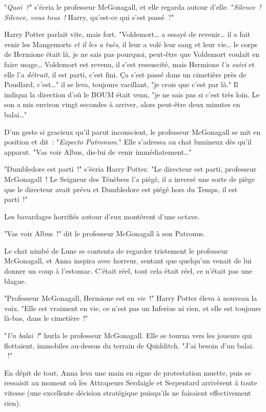 "\emph{Quoi~?}" s'écria le professeur McGonagall, et elle regarda autour d'elle. "\emph{Silence~! Silence, vous tous~!} Harry, qu'est-ce qui s'est passé~?"

Harry Potter parlait vite, mais fort. "Voldemort… a essayé de revenir… il a fait venir les Mangemorts \emph{et il les a tués}, il leur a volé leur sang et leur vie… le corps de Hermione était là, je ne sais pas pourquoi, peut-être que Voldemort voulait en faire usage… Voldemort est revenu, il s'est ressuscité, mais Hermione \emph{l'a suivi} et elle l'a \emph{détruit}, il est parti, c'est fini. Ça s'est passé dans un cimetière près de Poudlard, c'est…" il se leva, toujours vacillant, "je crois que c'est par là." Il indiqua la direction d'où le BOUM était venu, "je ne sais pas si c'est très loin. Le son a mis environ vingt secondes à arriver, alors peut-être deux minutes en balai…"

D'un geste si gracieux qu'il parut inconscient, le professeur McGonagall se mit en position et dit~: "\emph{Expecto Patronum.}" Elle s'adressa au chat lumineux dès qu'il apparut. "Vas voir Albus, dis-lui de venir immédiatement…"

"Dumbledore est parti~!" s'écria Harry Potter. "Le directeur est parti, professeur McGonagall~! Le Seigneur des Ténèbres l'a piégé, il a inversé une sorte de piège que le directeur avait prévu et Dumbledore est piégé hors du Temps, il est parti~!"

Les bavardages horrifiés autour d'eux montèrent d'une octave.

"Vas voir Albus~!" dit le professeur McGonagall à son Patronus.

Le chat nimbé de Lune se contenta de regarder tristement le professeur McGonagall, et Anna inspira avec horreur, sentant que quelqu'un venait de lui donner un coup à l'estomac. C'était réel, tout cela était réel, ce n'était pas une blague.

"Professeur McGonagall, Hermione est en \emph{vie}~!" Harry Potter éleva à nouveau la voix. "Elle est vraiment en vie, ce n'est pas un Inferius ni rien, et elle est toujours là-bas, dans le cimetière~!"

"\emph{Un balai~!}" hurla le professeur McGonagall. Elle se tourna vers les joueurs qui flottaient, immobiles au-dessus du terrain de Quidditch. "J'ai besoin d'un balai. ~!"

En dépit de tout, Anna leva une main en signe de protestation muette, puis se ressaisit au moment où les Attrapeurs Serdaigle et Serpentard arrivèrent à toute vitesse (une excellente décision stratégique puisqu'ils ne faisaient effectivement rien).

